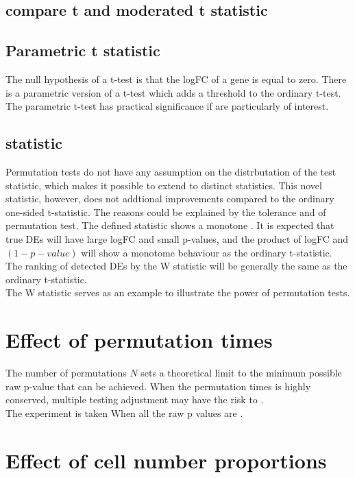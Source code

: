 \subsection{compare t and moderated t statistic}
\subsection{Parametric t statistic}
The null hypothesis of a t-test is that the logFC of a gene is equal to zero. There is a parametric version of a t-test which adds a threshold to the ordinary t-test. The parametric t-test has practical significance if  are particularly of interest. 
\subsection{ statistic}
Permutation tests do not have any assumption on the distrbutation of the test statistic, which makes it possible to extend to distinct statistics. 
This novel statistic, however, does not addtional improvements compared to the ordinary one-sided t-statistic. The reasons could be explained by the tolerance and of permutation test. The defined statistic shows a monotone . It is expected that true DEs will have large logFC and small p-values, and the product of logFC and $(1-p-value)$ will show a monotome behaviour as the ordinary t-statistic. The ranking of detected DEs by the W statistic will be generally the same as the ordinary t-statistic. \\
The W statistic serves as an example to illustrate the power of permutation tests. 
\section{Effect of permutation times}
The number of permutations $N$ sets a theoretical limit to the minimum possible raw p-value that can be achieved. When the permutation times is highly conserved, multiple testing adjustment may have the risk to . \\
The experiment is taken 
When all the raw p values are . 
\section{Effect of cell number proportions}
\subsection{}
